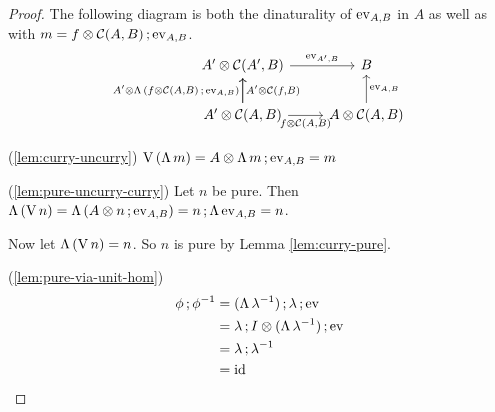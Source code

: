 \documentclass[runningheads,envcountsame]{llncs}
\begin{document}
\begin{proof}
    The following diagram is both the dinaturality of $\eval_{A, B}$ in $A$ as well as  with $m = \comp{\tensor{f}{\C(A, B)}}{\eval_{A, B}}$.
    \begin{equation}
        \begin{tikzcd}
            \tensor{A'}{\C(A', B)} \ar[r, "\eval_{A', B}"] & B \\
            \tensor{A'}{\C(A, B)} \ar[u, "\tensor{A'}{\curry\,(\comp{\tensor{f}{\C(A, B)}}{\eval_{A, B}})}"] \ar[u, swap, "\tensor{A'}{\C(f, B)}"] \ar[r, swap, "\tensor{f}{\C(A, B)}"] & \tensor{A}{\C(A, B)} \ar[u, swap, "\eval_{A, B}"] 
        \end{tikzcd}
    \end{equation}
    
    (\ref{lem:curry-uncurry}) $\uncurry\,(\curry\,m) = \comp{\tensor{A}{\curry\,m}}{\eval_{A, B}} = m$
    
    (\ref{lem:pure-uncurry-curry}) Let $n$ be pure. Then $\curry\,(\uncurry\,n) = \curry\,(\comp{\tensor{A}{n}}{\eval_{A, B}}) = \comp{n}{\curry\,\eval_{A, B}} = n$.
    
    Now let $\curry\,(\uncurry\,n) = n$. So $n$ is pure by Lemma \ref{lem:curry-pure}.
    
    (\ref{lem:pure-via-unit-hom})
    \begin{align}
        \comp{\phi}{\phi^{-1}} &= \comp{(\curry\,\unitl^{-1})}{\comp{\unitl}{\eval}} \\
                               &= \comp{\unitl}{\comp{\tensor{I}{(\curry\,\unitl^{-1})}}{\eval}} \\
                               &= \comp{\unitl}{\unitl^{-1}} \\
                               &= \id
    \end{align}
\end{proof}
\end{document}
